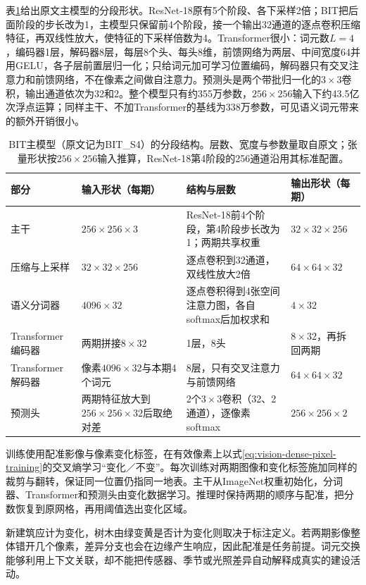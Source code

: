 表\ref{tab:vision-recognition-bit-structure}给出原文主模型的分段形状。ResNet-18原有5个阶段、各下采样2倍；BIT把后面阶段的步长改为1，主模型只保留前4个阶段，接一个输出32通道的逐点卷积压缩特征，再双线性放大，使特征的下采样倍数为4。Transformer很小：词元数$L=4$，编码器1层，解码器8层，每层8个头、每头8维，前馈网络为两层、中间宽度64并用GELU，各子层前置层归一化；只给词元加可学习位置编码，解码器只有交叉注意力和前馈网络，不在像素之间做自注意力。预测头是两个带批归一化的$3\times3$卷积，输出通道依次为32和2。整个模型只有约355万参数，$256\times256$输入下约43.5亿次浮点运算；同样主干、不加Transformer的基线为338万参数，可见语义词元带来的额外开销很小。

\begin{table}[tbp]
 \centering
 \small
 \begin{tabularx}{\linewidth}{@{}llXl@{}}
 \toprule
 部分 & 输入形状（每期） & 结构与层数 & 输出形状（每期）\\
 \midrule
 主干 & $256\times256\times3$ & ResNet-18前4个阶段，第4阶段步长改为1；两期共享权重 & $32\times32\times256$\\
 压缩与上采样 & $32\times32\times256$ & 逐点卷积到32通道，双线性放大2倍 & $64\times64\times32$\\
 语义分词器 & $4096\times32$ & 逐点卷积得到4张空间注意力图，各自softmax后加权求和 & $4\times32$\\
 Transformer编码器 & 两期拼接$8\times32$ & 1层，8头 & $8\times32$，再拆回两期\\
 Transformer解码器 & 像素$4096\times32$与本期4个词元 & 8层，只有交叉注意力与前馈网络 & $64\times64\times32$\\
 预测头 & 两期特征放大到$256\times256\times32$后取绝对差 & 2个$3\times3$卷积（32、2通道），逐像素softmax & $256\times256\times2$\\
 \bottomrule
 \end{tabularx}
 \caption{BIT主模型（原文记为BIT\_S4）的分段结构。层数、宽度与参数量取自原文；张量形状按$256\times256$输入推算，ResNet-18第4阶段的256通道沿用其标准配置。}
 \label{tab:vision-recognition-bit-structure}
\end{table}

训练使用配准影像与像素变化标签，在有效像素上以式\eqref{eq:vision-dense-pixel-training}的交叉熵学习“变化／不变”。每次训练对两期图像和变化标签施加同样的裁剪与翻转，保证同一位置仍指同一地表。主干从ImageNet权重初始化，分词器、Transformer和预测头由变化数据学习。推理时保持两期的顺序与配准，把分数恢复到原网格，再用阈值选出变化区域。

新建筑应计为变化，树木由绿变黄是否计为变化则取决于标注定义。若两期影像整体错开几个像素，差异分支也会在边缘产生响应，因此配准是任务前提。词元交换能够利用上下文关联，却不能把传感器、季节或光照差异自动解释成真实的建设活动。

